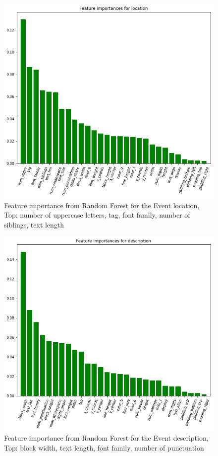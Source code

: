 \begin{figure}[h]
\begin{center}
\includegraphics[width=1.0\textwidth]{figures/importanceLocation}
\caption{Feature importance from Random Forest for the Event location, Top: number of uppercase letters, tag, font family, number of siblings, text length}
\label{fig:importanceLocation}
\end{center}
\end{figure}

\begin{figure}[h]
\begin{center}
\includegraphics[width=1.0\textwidth]{figures/importanceDescription}
\caption{Feature importance from Random Forest for the Event description, Top: block width, text length, font family, number of punctuation}
\label{fig:importanceDescription}
\end{center}
\end{figure}

